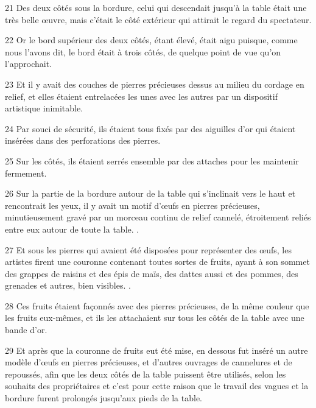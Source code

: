 \par 21 Des deux côtés sous la bordure, celui qui descendait jusqu'à la table était une très belle œuvre, mais c'était le côté extérieur qui attirait le regard du spectateur.

\par 22 Or le bord supérieur des deux côtés, étant élevé, était aigu puisque, comme nous l'avons dit, le bord était à trois côtés, de quelque point de vue qu'on l'approchait.

\par 23 Et il y avait des couches de pierres précieuses dessus au milieu du cordage en relief, et elles étaient entrelacées les unes avec les autres par un dispositif artistique inimitable.

\par 24 Par souci de sécurité, ils étaient tous fixés par des aiguilles d'or qui étaient insérées dans des perforations des pierres.

\par 25 Sur les côtés, ils étaient serrés ensemble par des attaches pour les maintenir fermement.

\par 26 Sur la partie de la bordure autour de la table qui s'inclinait vers le haut et rencontrait les yeux, il y avait un motif d'œufs en pierres précieuses, minutieusement gravé par un morceau continu de relief cannelé, étroitement reliés entre eux autour de toute la table. .

\par 27 Et sous les pierres qui avaient été disposées pour représenter des œufs, les artistes firent une couronne contenant toutes sortes de fruits, ayant à son sommet des grappes de raisins et des épis de maïs, des dattes aussi et des pommes, des grenades et autres, bien visibles. .

\par 28 Ces fruits étaient façonnés avec des pierres précieuses, de la même couleur que les fruits eux-mêmes, et ils les attachaient sur tous les côtés de la table avec une bande d'or.

\par 29 Et après que la couronne de fruits eut été mise, en dessous fut inséré un autre modèle d'œufs en pierres précieuses, et d'autres ouvrages de cannelures et de repoussés, afin que les deux côtés de la table puissent être utilisés, selon les souhaits des propriétaires et c'est pour cette raison que le travail des vagues et la bordure furent prolongés jusqu'aux pieds de la table.

